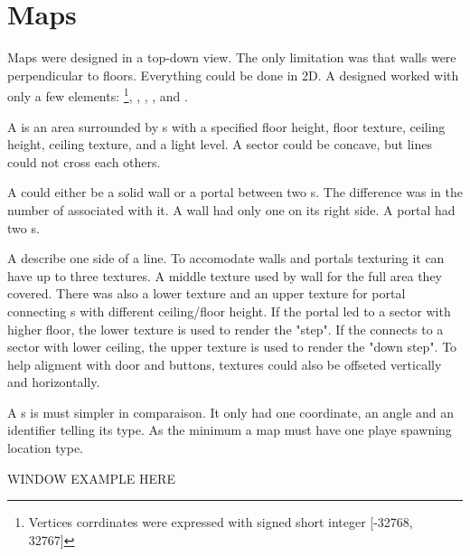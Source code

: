 

\section{Maps}
Maps were designed in a top-down view. The only limitation was that walls were perpendicular to floors. Everything could be done in 2D. A designed worked with only a few elements: \footnote{Vertices corrdinates were expressed with signed short integer [-32768, 32767]}, , , , and .\\
\par
{}
\par
A  is an area surrounded by s with a specified floor height, floor texture, ceiling height, ceiling texture, and a light level. A sector could be concave, but lines could not cross each others.\\
\par
A  could either be a solid wall or a portal between two s. The difference was in the number of  associated with it. A wall had only one  on its right side. A portal had two s.\\
\par
A  describe one side of a line. To accomodate walls and portals texturing it can have up to three textures. A middle texture used by wall for the full area they covered. There was also a lower texture and an upper texture for portal connecting s with different ceiling/floor height. If the portal led to a sector with higher floor, the lower texture is used to render the "step". If the  connects to a sector with lower ceiling, the upper texture is used to render the "down step". To help aligment with door and buttons,  textures could also be offseted vertically and horizontally.\\
\par
A s is must simpler in comparaison. It only had one  coordinate, an angle and an identifier telling its type. As the minimum a map must have one playe spawning location  type. 

WINDOW EXAMPLE HERE\\
\par
\pagebreak



